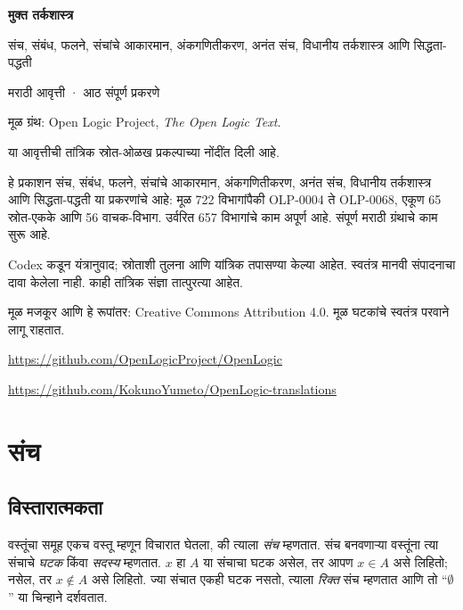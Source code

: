\documentclass[11pt,a4paper,openany]{book}
\theoremstyle{definition}
\begin{document}
\begin{titlepage}
\vspace*{2cm}
{\Huge\bfseries मुक्त तर्कशास्त्र\par}
\vspace{1cm}
{\LARGE संच, संबंध, फलने, संचांचे आकारमान, अंकगणितीकरण, अनंत संच, विधानीय तर्कशास्त्र आणि सिद्धता-पद्धती\par}
\vspace{1cm}
{\large मराठी आवृत्ती · आठ संपूर्ण प्रकरणे\par}
\vfill
मूळ ग्रंथ: Open Logic Project, \textit{The Open Logic Text}.\par
या आवृत्तीची तांत्रिक स्रोत-ओळख प्रकल्पाच्या नोंदींत दिली आहे.\par
हे प्रकाशन संच, संबंध, फलने, संचांचे आकारमान, अंकगणितीकरण, अनंत संच, विधानीय तर्कशास्त्र आणि सिद्धता-पद्धती या प्रकरणांचे आहे: मूळ 722 विभागांपैकी OLP-0004 ते OLP-0068, एकूण 65 स्रोत-एकके आणि 56 वाचक-विभाग. उर्वरित 657 विभागांचे काम अपूर्ण आहे.
संपूर्ण मराठी ग्रंथाचे काम सुरू आहे.\par
Codex कडून यंत्रानुवाद; स्रोताशी तुलना आणि यांत्रिक तपासण्या केल्या आहेत.
स्वतंत्र मानवी संपादनाचा दावा केलेला नाही. काही तांत्रिक संज्ञा तात्पुरत्या आहेत.\par
मूळ मजकूर आणि हे रूपांतर: Creative Commons Attribution 4.0.
मूळ घटकांचे स्वतंत्र परवाने लागू राहतात.\par
\url{https://github.com/OpenLogicProject/OpenLogic}\par
\url{https://github.com/KokunoYumeto/OpenLogic-translations}
\end{titlepage}
\tableofcontents
\chapter{संच}








\section{विस्तारात्मकता}\label{sfr:set:bas:sec}

वस्तूंचा समूह एकच वस्तू {म्हणून} विचारात घेतला, की त्याला \emph{संच} म्हणतात.
संच बनवणाऱ्या वस्तूंना त्या संचाचे \emph{घटक} किंवा \emph{सदस्य} म्हणतात.
$x$ हा $A$ या संचाचा घटक असेल, तर आपण $x \in A$ असे लिहितो;
नसेल, तर $x \notin A$ असे लिहितो. ज्या संचात एकही घटक नसतो,
त्याला \emph{रिक्त} संच म्हणतात आणि तो ``$\emptyset$'' या चिन्हाने दर्शवतात.
\end{document}
